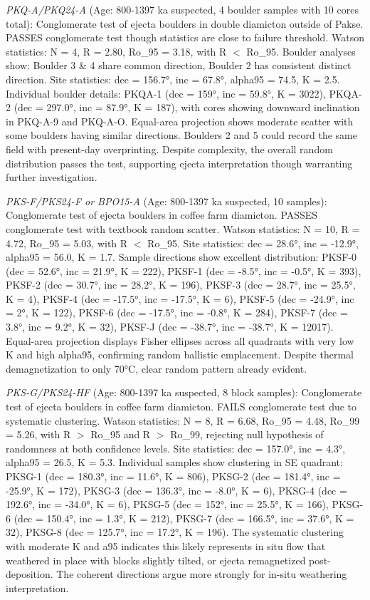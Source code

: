 \documentclass[twocolumn,11pt]{article}
\begin{document}
\textit{PKQ-A/PKQ24-A} (Age: 800-1397 ka suspected, 4 boulder samples with 10 cores total): Conglomerate test of ejecta boulders in double diamicton outside of Pakse. PASSES conglomerate test though statistics are close to failure threshold. Watson statistics: N = 4, R = 2.80, Ro\_95 = 3.18, with R $<$ Ro\_95. Boulder analyses show: Boulder 3 \& 4 share common direction, Boulder 2 has consistent distinct direction. Site statistics: dec = 156.7°, inc = 67.8°, alpha95 = 74.5, K = 2.5. Individual boulder details: PKQA-1 (dec = 159°, inc = 59.8°, K = 3022), PKQA-2 (dec = 297.0°, inc = 87.9°, K = 187), with cores showing downward inclination in PKQ-A-9 and PKQ-A-O. Equal-area projection shows moderate scatter with some boulders having similar directions. Boulders 2 and 5 could record the same field with present-day overprinting. Despite complexity, the overall random distribution passes the test, supporting ejecta interpretation though warranting further investigation.

\textit{PKS-F/PKS24-F or BPO15-A} (Age: 800-1397 ka suspected, 10 samples): Conglomerate test of ejecta boulders in coffee farm diamicton. PASSES conglomerate test with textbook random scatter. Watson statistics: N = 10, R = 4.72, Ro\_95 = 5.03, with R $<$ Ro\_95. Site statistics: dec = 28.6°, inc = -12.9°, alpha95 = 56.0, K = 1.7. Sample directions show excellent distribution: PKSF-0 (dec = 52.6°, inc = 21.9°, K = 222), PKSF-1 (dec = -8.5°, inc = -0.5°, K = 393), PKSF-2 (dec = 30.7°, inc = 28.2°, K = 196), PKSF-3 (dec = 28.7°, inc = 25.5°, K = 4), PKSF-4 (dec = -17.5°, inc = -17.5°, K = 6), PKSF-5 (dec = -24.9°, inc = 2°, K = 122), PKSF-6 (dec = -17.5°, inc = -0.8°, K = 284), PKSF-7 (dec = 3.8°, inc = 9.2°, K = 32), PKSF-J (dec = -38.7°, inc = -38.7°, K = 12017). Equal-area projection displays Fisher ellipses across all quadrants with very low K and high alpha95, confirming random ballistic emplacement. Despite thermal demagnetization to only 70°C, clear random pattern already evident.

\textit{PKS-G/PKS24-HF} (Age: 800-1397 ka suspected, 8 block samples): Conglomerate test of ejecta boulders in coffee farm diamicton. FAILS conglomerate test due to systematic clustering. Watson statistics: N = 8, R = 6.68, Ro\_95 = 4.48, Ro\_99 = 5.26, with R $>$ Ro\_95 and R $>$ Ro\_99, rejecting null hypothesis of randomness at both confidence levels. Site statistics: dec = 157.0°, inc = 4.3°, alpha95 = 26.5, K = 5.3. Individual samples show clustering in SE quadrant: PKSG-1 (dec = 180.3°, inc = 11.6°, K = 806), PKSG-2 (dec = 181.4°, inc = -25.9°, K = 172), PKSG-3 (dec = 136.3°, inc = -8.0°, K = 6), PKSG-4 (dec = 192.6°, inc = -34.0°, K = 6), PKSG-5 (dec = 152°, inc = 25.5°, K = 166), PKSG-6 (dec = 150.4°, inc = 1.3°, K = 212), PKSG-7 (dec = 166.5°, inc = 37.6°, K = 32), PKSG-8 (dec = 125.7°, inc = 17.2°, K = 196). The systematic clustering with moderate K and a95 indicates this likely represents in situ flow that weathered in place with blocks slightly tilted, or ejecta remagnetized post-deposition. The coherent directions argue more strongly for in-situ weathering interpretation.
\end{document}
